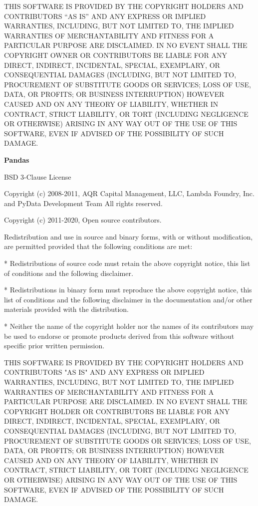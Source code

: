 THIS SOFTWARE IS PROVIDED BY THE COPYRIGHT HOLDERS AND CONTRIBUTORS “AS IS” AND ANY EXPRESS OR IMPLIED WARRANTIES, INCLUDING, BUT NOT LIMITED TO, THE IMPLIED WARRANTIES OF MERCHANTABILITY AND FITNESS FOR A PARTICULAR PURPOSE ARE DISCLAIMED. IN NO EVENT SHALL THE COPYRIGHT OWNER OR CONTRIBUTORS BE LIABLE FOR ANY DIRECT, INDIRECT, INCIDENTAL, SPECIAL, EXEMPLARY, OR CONSEQUENTIAL DAMAGES (INCLUDING, BUT NOT LIMITED TO, PROCUREMENT OF SUBSTITUTE GOODS OR SERVICES; LOSS OF USE, DATA, OR PROFITS; OR BUSINESS INTERRUPTION) HOWEVER CAUSED AND ON ANY THEORY OF LIABILITY, WHETHER IN CONTRACT, STRICT LIABILITY, OR TORT (INCLUDING NEGLIGENCE OR OTHERWISE) ARISING IN ANY WAY OUT OF THE USE OF THIS SOFTWARE, EVEN IF ADVISED OF THE POSSIBILITY OF SUCH DAMAGE.

\textbf{Pandas}

BSD 3-Clause License

Copyright (c) 2008-2011, AQR Capital Management, LLC, Lambda Foundry, Inc. and PyData Development Team
All rights reserved.

Copyright (c) 2011-2020, Open source contributors.

Redistribution and use in source and binary forms, with or without
modification, are permitted provided that the following conditions are met:

* Redistributions of source code must retain the above copyright notice, this
list of conditions and the following disclaimer.

* Redistributions in binary form must reproduce the above copyright notice,
this list of conditions and the following disclaimer in the documentation
and/or other materials provided with the distribution.

* Neither the name of the copyright holder nor the names of its
contributors may be used to endorse or promote products derived from
this software without specific prior written permission.

THIS SOFTWARE IS PROVIDED BY THE COPYRIGHT HOLDERS AND CONTRIBUTORS "AS IS"
AND ANY EXPRESS OR IMPLIED WARRANTIES, INCLUDING, BUT NOT LIMITED TO, THE
IMPLIED WARRANTIES OF MERCHANTABILITY AND FITNESS FOR A PARTICULAR PURPOSE ARE
DISCLAIMED. IN NO EVENT SHALL THE COPYRIGHT HOLDER OR CONTRIBUTORS BE LIABLE
FOR ANY DIRECT, INDIRECT, INCIDENTAL, SPECIAL, EXEMPLARY, OR CONSEQUENTIAL
DAMAGES (INCLUDING, BUT NOT LIMITED TO, PROCUREMENT OF SUBSTITUTE GOODS OR
SERVICES; LOSS OF USE, DATA, OR PROFITS; OR BUSINESS INTERRUPTION) HOWEVER
CAUSED AND ON ANY THEORY OF LIABILITY, WHETHER IN CONTRACT, STRICT LIABILITY,
OR TORT (INCLUDING NEGLIGENCE OR OTHERWISE) ARISING IN ANY WAY OUT OF THE USE
OF THIS SOFTWARE, EVEN IF ADVISED OF THE POSSIBILITY OF SUCH DAMAGE.

